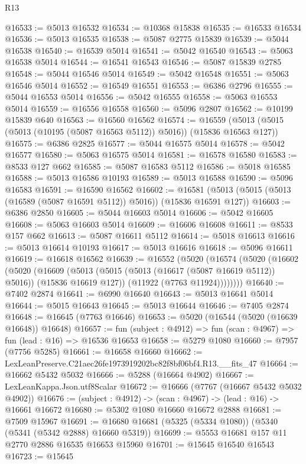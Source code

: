 \begin{lexlean}{R13}
\begin{coremodule}
@16533 := @5013 @16532
@16534 := @10368 @15838
@16535 := @16533 @16534
@16536 := @5013 @16535
@16538 := @5087 @2775 @15839
@16539 := @5044 @16538
@16540 := @16539 @5014
@16541 := @5042 @16540
@16543 := @5063 @16538 @5014
@16544 := @16541 @16543
@16546 := @5087 @15839 @2785
@16548 := @5044 @16546 @5014
@16549 := @5042 @16548
@16551 := @5063 @16546 @5014
@16552 := @16549 @16551
@16553 := @6386 @2796
@16555 := @5044 @16553 @5014
@16556 := @5042 @16555
@16558 := @5063 @16553 @5014
@16559 := @16556 @16558
@16560 := @5096 @2807
@16562 := @10199 @15839 @640
@16563 := @16560 @16562
@16574 := @16559 (@5013 (@5015 (@5013 (@10195 (@5087 @16563 @5112)) @5016)) (@15836 @16563 @127))
@16575 := @6386 @2825
@16577 := @5044 @16575 @5014
@16578 := @5042 @16577
@16580 := @5063 @16575 @5014
@16581 := @16578 @16580
@16583 := @8533 @127 @662
@16585 := @5087 @16583 @5112
@16586 := @5018 @16585
@16588 := @5013 @16586 @10193
@16589 := @5013 @16588
@16590 := @5096 @16583
@16591 := @16590 @16562
@16602 := @16581 (@5013 (@5015 (@5013 (@16589 (@5087 @16591 @5112)) @5016)) (@15836 @16591 @127))
@16603 := @6386 @2850
@16605 := @5044 @16603 @5014
@16606 := @5042 @16605
@16608 := @5063 @16603 @5014
@16609 := @16606 @16608
@16611 := @8533 @157 @662
@16613 := @5087 @16611 @5112
@16614 := @5018 @16613
@16616 := @5013 @16614 @10193
@16617 := @5013 @16616
@16618 := @5096 @16611
@16619 := @16618 @16562
@16639 := @16552
    (@5020
      (@16574
        (@5020
          (@16602
            (@5020
              (@16609
                (@5013 (@5015 (@5013 (@16617 (@5087 @16619 @5112)) @5016)) (@15836 @16619 @127))
                (@11922 (@7763 @11924))))))))
@16640 := @7402 @2874
@16641 := @6990 @16640
@16643 := @5013 @16641 @5014
@16644 := @5015 @16643
@16645 := @5013 @16644
@16646 := @7405 @2874
@16648 := @16645 (@7763 @16646)
@16653 := @5020 (@16544 (@5020 (@16639 @16648)) @16648)
@16657 := fun (subject : @4912) => fun (scan : @4967) => fun (lead : @16) => @16536 @16653
@16658 := @5279 @1080
@16660 := @7957 (@7756 @5285)
@16661 := @16658 @16660
@16662 := LexLeanPreserve.C21aec26fe1973919202bc82f8bf06bf4.R13.__fits_47
@16664 := @16662 @5432 @5032
@16666 := @5288 (@16664 @4902)
@16667 := LexLeanKappa.Json.utf8Scalar
@16672 := @16666 (@7767 (@16667 @5432 @5032 @4902))
@16676 := (subject : @4912) -> (scan : @4967) -> (lead : @16) -> @16661 @16672
@16680 := @5302 @1080 @16660 @16672 @2888
@16681 := @7509 @15967
@16691 := @16680 @16681 (@5325 (@5334 @1080)) (@5340 (@5341 (@5342 @2888) @16660 @5319))
@16699 := @5553 @16681 @157 @11 @2770 @2886 @16535 @16653 @15960
@16701 := @15645 @16540 @16543
@16723 := @15645

\end{coremodule}
\end{lexlean}
